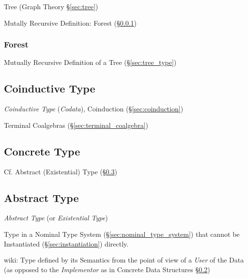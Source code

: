 Tree (Graph Theory \S\ref{sec:tree})

Mutally Recursive Definition: Forest (\S\ref{sec:forest_type})



\subsubsection{Forest}\label{sec:forest_type}

Mutually Recursive Definition of a Tree (\S\ref{sec:tree_type})



\subsection{Coinductive Type}\label{sec:coinductive_type}

\emph{Coinductive Type} (\emph{Codata}), Coinduction
(\S\ref{sec:coinduction})

Terminal Coalgebras (\S\ref{sec:terminal_coalgebra})



\subsection{Concrete Type}\label{sec:concrete_type}

\fist Cf. Abstract (Existential) Type (\S\ref{sec:abstract_type})



\subsection{Abstract Type}\label{sec:abstract_type}

\emph{Abstract Type} (or \emph{Existential Type})

Type in a Nominal Type System (\S\ref{sec:nominal_type_system}) that
cannot be Instantiated (\S\ref{sec:instantiation}) directly.

wiki: Type defined by its Semantics from the point of view of a
\emph{User} of the Data (as opposed to the \emph{Implementor} as in
Concrete Data Structures \S\ref{sec:concrete_type})

